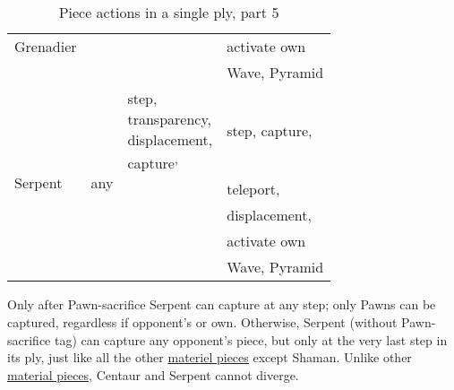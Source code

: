 \begin{table}[!h]
\begin{tabular}{ llll }
Grenadier                   &                           &                               & activate own              \\
                            &                           &                               & Wave, Pyramid             \\
\cmidrule{1-4} %
\multirow{5}{*}{Serpent}    & \multirow{5}{*}{any\footnotemark[2]}
                                                        & \parbox[b][1pt][s]{13ex}{step,\\transparency,\\displacement\footnotemark[3],\\capture\footnotemark[4]\textsuperscript{,}\footnotemark[5]}
                                                                                        & step, capture\footnotemark[5], \\
                            &                           &                               & teleport,                 \\
                            &                           &                               & displacement\footnotemark[3], \\
                            &                           &                               & activate own              \\
                            &                           &                               & Wave, Pyramid             \\
\bottomrule %
\end{tabular}
\caption{Piece actions in a single ply, part 5}
\label{tbl:Appendix/Summary/Piece actions, part 5}
\end{table}


Only after Pawn-sacrifice Serpent can capture at any step; only Pawns can be
captured, regardless if opponent's or own. Otherwise, Serpent (without Pawn-sacrifice
tag) can capture any opponent's piece, but only at the very last step in its ply,
just like all the other \hyperref[sec:Terms/Materiel]{materiel pieces} except Shaman.\newline
\indent
Unlike other \hyperref[sec:Terms/Material]{material pieces}, Centaur and Serpent
cannot diverge.


